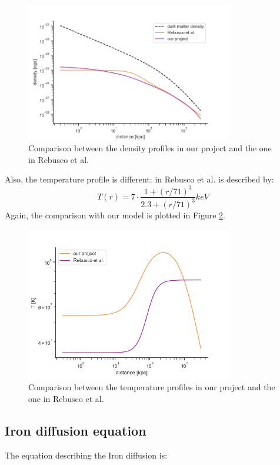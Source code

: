 \documentclass{article}
\begin{document}
\begin{figure}
\includegraphics[hb,width=0.8\textwidth]{rebusco.png}
\caption{Comparison between the density profiles in our project and the one in Rebusco et al.}
\label{fig:figure5}
\end{figure}
Also, the temperature profile is different: in Rebusco et al. is described by: 
\begin{equation}
T(r)=7 \cdot \frac{1+(r/71)^{3}}{2.3+(r/71)^{3}} keV
\end{equation}
Again, the comparison with our model is plotted in Figure \ref{fig:figure6}.
\begin{figure}
\includegraphics[width=0.8\textwidth]{temp2}
\caption{Comparison between the temperature profiles in our project and the one in Rebusco et al.}
\label{fig:figure6}
\end{figure}
\subsection{Iron diffusion equation}
The equation describing the Iron diffusion is:
\end{document}
